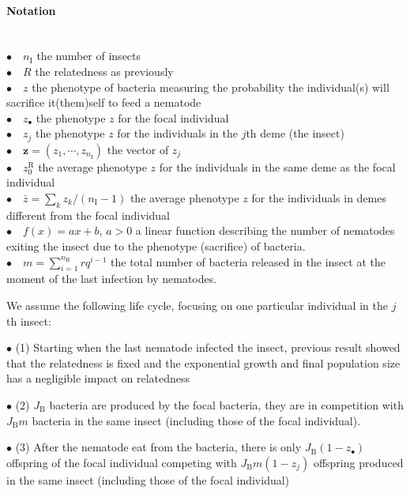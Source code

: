 \documentclass{article}
\newcommand{\nN}{{n_\textrm{H}}}
\newcommand{\nI}{{n_\textrm{I}}}
\begin{document}
  \paragraph{Notation} $ $\\
 $\bullet \quad \nI$ the number of insects \\
 $\bullet \quad R$ the relatedness as previously \\
 $\bullet \quad z$ the phenotype of bacteria measuring the probability the individual(s) will sacrifice it(them)self to feed a nematode\\
 $\bullet \quad z_\bullet $ the phenotype $z$ for the focal individual\\
 $\bullet \quad z_j$ the phenotype $z$ for the individuals in the $j$th deme (the insect)\\
 $\bullet \quad \mathbf{z}=(z_1,\cdots,z_{\nI})$ the vector of $z_j$\\
 $\bullet \quad z_0^{\mathrm{R}}$ the average phenotype $z$ for the individuals in the same deme as the focal individual\\
 $\bullet \quad \bar{z}=\sum_k z_k / (\nI -1) $ the average phenotype $z$ for the individuals in demes different from the focal individual\\
 $\bullet \quad f (x)=ax+b$, $a>0$ a linear function describing the number of nematodes exiting the insect due to the phenotype (sacrifice) of bacteria.\\
 $\bullet \quad m=\sum_{i=1}^\nN r q^{i-1}$ the total number of bacteria released in the insect at the moment of the last infection by nematodes.
 
 
 
 We assume the following life cycle, focusing on one particular individual in the $j$th insect:
 
 
 $\bullet$ (1) Starting when the last nematode infected the insect, previous result showed that the relatedness is fixed and the exponential growth and final population size has a negligible impact on relatedness
 
 
 $\bullet$ (2) $J_{\mathrm{B}}$ bacteria are produced by the focal bacteria, they are in competition with $J_{\mathrm{B}} m$ bacteria in the same insect (including those of the focal individual).
 
 
 $\bullet$ (3) After the nematode eat from the bacteria, there is only $J_{\mathrm{B}}(1-z_\bullet)$ offspring of the focal individual competing with $J_{\mathrm{B}} m (1-z_j)$ offspring produced in the same insect (including those of the focal individual)
 
\end{document}

